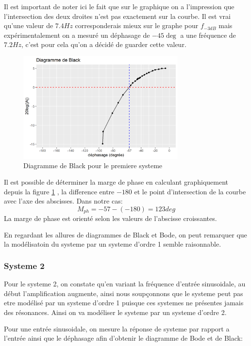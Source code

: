 \documentclass[12pt, a4paper]{report}
\begin{document}
Il est important de noter ici le fait que sur le graphique on a l'impression que
l'intersection des deux droites n'est pas exactement sur la courbe. Il est vrai 
qu'une valeur de $7.4 Hz$ corresponderais mieux sur le graphe pour $f_{-3dB}$ mais 
expérimentalement on a mesuré un déphasage de $-45 \deg$ a une fréquence de $7.2 Hz$, c'est pour 
cela qu'on a décidé de guarder cette valeur.

\begin{figure}[H]
    \centering
    \includegraphics[width=0.75\textwidth]{black1.png}
    \caption{Diagramme de Black pour le premiere systeme}
    \label{fig:diagBlack1}
\end{figure}

Il est possible de déterminer la marge de phase en calculant graphiquement depuis la figure \ref{fig:diagBlack1}
, la difference entre 
$-180$ et le point d'intersection de la courbe avec l'axe des abscisses. Dans notre cas:
\[
    M_{ph} = -57 - (-180) = 123 deg
    \]
La marge de phase est orienté selon les valeurs de l'abscisse croissantes.\par 

En regardant les allures de diagrammes de Black et Bode, on peut remarquer que la modélisatoin du systeme par un systeme d'ordre
1 semble raisonnable.


\subsubsection{Systeme 2}

Pour le systeme 2, on constate qu'en variant la fréquence d'entrée sinusoidale, au début l'amplification augmente, ainsi
nous soupçonnons que le systeme peut pas etre modélisé par un systeme d'ordre 1 puisque ces systemes
ne présentes jamais des résonances. Ainsi on va modéliser le systeme par un systeme d'ordre 2.

Pour une entrée sinusoidale, on mesure la réponse de systeme par rapport a l'entrée ainsi que le déphasage afin d'obtenir 
le diagramme de Bode et de Black:
\end{document}
